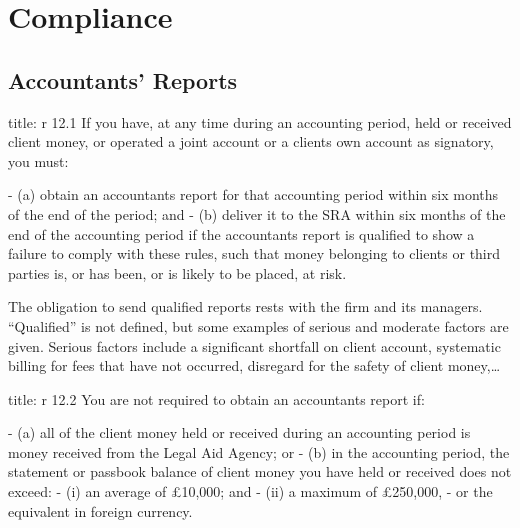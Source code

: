 \documentclass[
]{article}
\newenvironment{Shaded}{}{}
\newcommand{\NormalTok}[1]{#1}
\begin{document}
\hypertarget{compliance}{%
\section{Compliance}\label{compliance}}

\hypertarget{accountants-reports-1}{%
\subsection{Accountants' Reports}\label{accountants-reports-1}}

\begin{Shaded}
\begin{Highlighting}[]
\NormalTok{title: r 12.1}
\NormalTok{If you have, at any time during an accounting period, held or received client money, or operated a joint account or a client\textquotesingle{}s own account as signatory, you must:}

\NormalTok{{-} (a) obtain an accountant\textquotesingle{}s report for that accounting period within six months of the end of the period; and}
\NormalTok{{-} (b) deliver it to the SRA within six months of the end of the accounting period if the accountant\textquotesingle{}s report is qualified to show a failure to comply with these rules, such that money belonging to clients or third parties is, or has been, or is likely to be placed, at risk.}
\end{Highlighting}
\end{Shaded}

The obligation to send qualified reports rests with the firm and its
managers. ``Qualified'' is not defined, but some examples of serious and
moderate factors are given. Serious factors include a significant
shortfall on client account, systematic billing for fees that have not
occurred, disregard for the safety of client money,\ldots{}

\begin{Shaded}
\begin{Highlighting}[]
\NormalTok{title: r 12.2}
\NormalTok{You are not required to obtain an accountant\textquotesingle{}s report if:}

\NormalTok{{-} (a) all of the client money held or received during an accounting period is money received from the Legal Aid Agency; or}
\NormalTok{{-} (b) in the accounting period, the statement or passbook balance of client money you have held or received does not exceed:}
\NormalTok{    {-} (i) an average of £10,000; and}
\NormalTok{    {-} (ii) a maximum of £250,000,}
\NormalTok{{-} or the equivalent in foreign currency.}
\end{Highlighting}
\end{Shaded}
\end{document}
